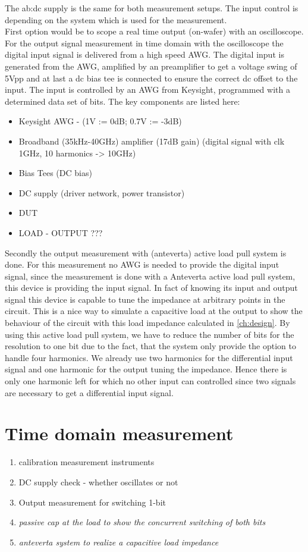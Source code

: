 The \gls{ab:dc} supply is the same for both measurement setups.
The input control is depending on the system which is used for the measurement.\\
First option would be to scope a real time output (on-wafer) with an oscilloscope.
For the output signal measurement in time domain with the oscilloscope the digital input signal is delivered from a high speed AWG.
The digital input is generated from the AWG, amplified by an preamplifier to get a voltage swing of 5Vpp and at last a dc bias tee is connected to ensure the correct dc offset to the input.
 The input is controlled by an AWG from Keysight, programmed with a determined data set of bits. The key components are listed here:
\begin{itemize}
	\item Keysight AWG - (1V := 0dB; 0.7V := -3dB)
	\item Broadband (35kHz-40GHz) amplifier (17dB gain) (digital signal with clk 1GHz, 10 harmonics -> 10GHz)
	\item Bias Tees (DC bias)
	\item DC supply (driver network, power transistor)
	\item DUT
	\item LOAD - OUTPUT ???
\end{itemize}

Secondly the output measurement with (anteverta) active load pull system is done.
For this measurement no AWG is needed to provide the digital input signal, since the measurement is done with a Anteverta active load pull system, this device is providing the input signal.
In fact of knowing its input and output signal this device is capable to tune the impedance at arbitrary points in the circuit.
This is a nice way to simulate a capacitive load at the output to show the behaviour of the circuit with this load impedance calculated in \ref{ch:design}.
By using this active load pull system, we have to reduce the number of bits for the resolution to one bit due to the fact, that the system only provide the option to handle four harmonics. 
We already use two harmonics for the differential input signal and one harmonic for the output tuning the impedance. 
Hence there is only one harmonic left for which no other input can controlled since two signals are necessary to get a differential input signal.
\section{Time domain measurement}
\begin{enumerate}
	\item calibration measurement instruments
	\item DC supply check - whether oscillates or not
	\item Output measurement for switching 1-bit
	\item \textit{passive cap at the load to show the concurrent switching of both bits}
	\item \textit{anteverta system to realize a capacitive load impedance}
\end{enumerate}
